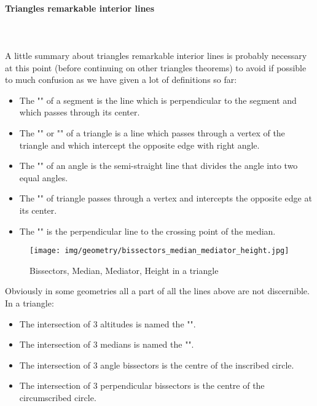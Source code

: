 	\paragraph{Triangles remarkable interior lines}\mbox{}\\\\
	A little summary about triangles remarkable interior lines is probably necessary at this point (before continuing on other triangles theorems) to avoid if possible to much confusion as we have given a lot of definitions so far:
	\begin{itemize}
		\item The "" of a segment is the line which is perpendicular to the segment and which passes through its center.

		\item The "" or ""  of a triangle is a line which passes through a vertex of the triangle and which intercept the opposite edge with right angle.

		\item The "" of an angle is the semi-straight line that divides the angle into two equal angles.

		\item The "" of triangle passes through a vertex and intercepts the opposite edge at its center.

		\item The "" is the perpendicular line to the crossing point of the median.
	\end{itemize}
	\begin{figure}[H]
		\centering
		\texttt{[image: img/geometry/bissectors\_median\_mediator\_height.jpg]}
		\caption{Bissectors, Median, Mediator, Height in a triangle}
	\end{figure}
	Obviously in some geometries all a part of all the lines above are not discernible.
	In a triangle:
	\begin{itemize}
		\item The intersection of $3$ altitudes is named the "".
		\item The intersection of $3$ medians is named the "".
		\item The intersection of $3$ angle bissectors is the centre of the inscribed circle.
		\item The intersection of $3$ perpendicular bissectors is the centre of the circumscribed circle.
	\end{itemize}
	
